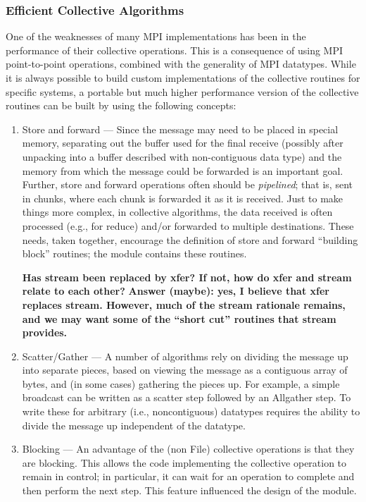 \documentclass[dvipdfm]{article}
\begin{document}
\subsubsection{Efficient Collective Algorithms}
One of the weaknesses of many MPI implementations has been in the
performance of their collective operations.  This is a consequence of
using MPI point-to-point operations, combined with the generality of
MPI datatypes.  While it is always possible to build custom
implementations of the collective routines for specific systems, a
portable but much higher performance version of the collective
routines can be built by using the following concepts:
\begin{enumerate}
\item Store and forward --- Since the message may need to be placed in
special memory, separating out the buffer used for the final receive
(possibly after unpacking into a buffer described with non-contiguous
data type) and the memory from which the message could be forwarded is
an important goal.  Further, store and
forward operations often should be \emph{pipelined}; that is, sent in
chunks, where each chunk is forwarded it as it is received.
Just to make things more complex, in collective algorithms, the data
received is often processed (e.g., for reduce) and/or forwarded to
multiple destinations.  These needs, taken together, encourage the
definition of store and forward ``building block'' routines; the 
module contains these routines.

\textbf{Has stream been replaced by xfer?  If not, how do xfer and
stream relate to each other?}
\textbf{Answer (maybe): yes, I believe that xfer replaces stream.
However, much of the stream rationale remains, and we may want some of
the ``short cut'' routines that stream provides.}

\item Scatter/Gather --- A number of algorithms rely on dividing the
message up into separate pieces, based on viewing the message as a
contiguous array of bytes, and (in some cases) gathering the pieces
up.  For example, a simple broadcast can be written as a scatter step
followed by an Allgather step.  To write these for arbitrary (i.e.,
noncontiguous) datatypes requires the ability to divide the message up
independent of the datatype.  

\item Blocking --- An advantage of the (non File) collective
operations is that they are blocking.  This allows the code
implementing the collective operation to remain in control; in
particular, it can wait for an operation to complete and then perform
the next step.  This feature influenced the design of the
 module.
\end{enumerate}
\end{document}
